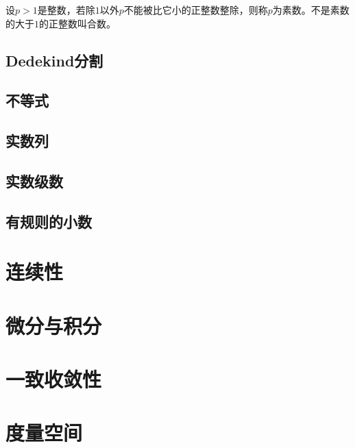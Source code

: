 \begin{definition}{}{}
设$p > 1$是整数，若除$1$以外$p$不能被比它小的正整数整除，则称$p$为素数。不是素数的大于$1$的正整数叫合数。
\end{definition}

\section{Dedekind分割}\label{sec0100102}


\section{不等式}\label{sec0100103}

\section{实数列}\label{sec0100104}

\section{实数级数}\label{sec0100105}

\section{有规则的小数}\label{sec0100106}


\chapter{连续性}\label{ch01002}


\chapter{微分与积分}\label{ch01003}

\chapter{一致收敛性}\label{ch01004}

\chapter{度量空间}\label{ch01005}












